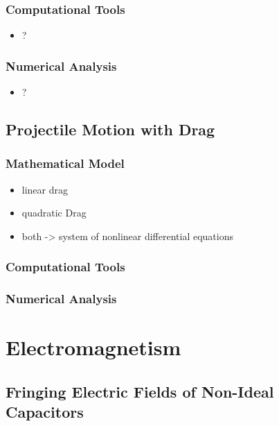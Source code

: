 \documentclass{report}
\begin{document}
        \subsection{Computational Tools}

            \begin{itemize}
                \item ?
            \end{itemize}

        \subsection{Numerical Analysis}

            \begin{itemize}
                \item ?
            \end{itemize}

    \section{Projectile Motion with Drag}

        \subsection{Mathematical Model}

            \begin{itemize}
                \item linear drag
                \item quadratic Drag
                \item both -> system of nonlinear differential equations
            \end{itemize}

        \subsection{Computational Tools}

        \subsection{Numerical Analysis}

\chapter{Electromagnetism}

    \section{Fringing Electric Fields of Non-Ideal Capacitors}
\end{document}
